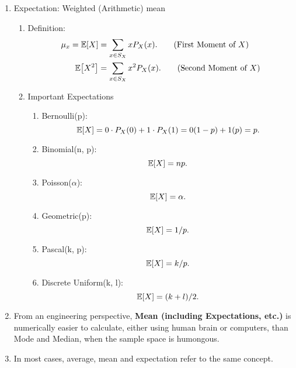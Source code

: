 \begin{enumerate}
{\begin{enumerate}
{\begin{enumerate}
                \item Median: The outcome which separates the higher half from  the lower half of a sample space \[P_X[X \leq x_{med}] \geq 1/2, \qquad \qquad P_X[X \geq x_{med}] \geq 1/2.\]
                \item (Arithmetic) mean:  The sum of all the outcomes divided by the number of outcomes \[\bar{x} = \frac{1}{n}\sum_{i=1}^{n}x_i.\]
            \end{enumerate}
            }
            \item Expectation: Weighted (Arithmetic) mean{
                \begin{enumerate}
                    \item Definition:{
                        \begin{align}
                            \mu_x = \E{X}&=\sum_{x\in S_X}xP_X(x). \tag{First Moment of $X$}\\
                            \E{X^2}&=\sum_{x\in S_X}x^2P_X(x). \tag{Second Moment of $X$}
                        \end{align}
                    }
                    \item Important Expectations{
                        \begin{enumerate}
                            \item Bernoulli(p): \[\E{X}=0\cdot P_X(0)+1\cdot P_X(1)=0(1-p)+1(p)=p.\]
                            \item Binomial(n, p): \[\E{X}=np.\]
                            \item Poisson($\alpha$): \[\E{X}=\alpha.\]
                            \item Geometric(p): \[\E{X}=1/p.\]
                            \item Pascal(k, p): \[\E{X}=k/p.\]
                            \item Discrete Uniform(k, l): \[\E{X}=(k+l)/2.\]
                        \end{enumerate}
                    }
                \end{enumerate}
            }
            \item From an engineering perspective, \textbf{Mean (including Expectations, etc.)} is numerically easier to calculate, either using human brain or computers, than Mode and Median, when the sample space is humongous. 
            \item In most cases, average, mean and expectation refer to the same concept. 
        \end{enumerate}
}
\end{enumerate}
